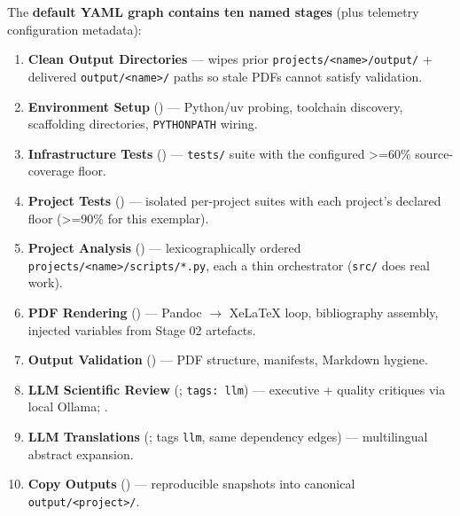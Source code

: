 \documentclass[
  english,
]{article}
\providecommand{\tightlist}{%
  \setlength{\itemsep}{0pt}\setlength{\parskip}{0pt}}
\begin{document}
The \textbf{default YAML graph contains ten named stages} (plus
telemetry configuration metadata):

\begin{enumerate}
\def\labelenumi{\arabic{enumi}.}
\tightlist
\item
  \textbf{Clean Output Directories} --- wipes prior
  \texttt{projects/\textless{}name\textgreater{}/output/} + delivered
  \texttt{output/\textless{}name\textgreater{}/} paths so stale PDFs
  cannot satisfy validation.
\item
  \textbf{Environment Setup} () ---
  Python/uv probing, toolchain discovery, scaffolding directories,
  \texttt{PYTHONPATH} wiring.
\item
  \textbf{Infrastructure Tests}
  () --- \texttt{tests/} suite
  with the configured \texorpdfstring{\textgreater{}=}{>=}60\% source-coverage floor.
\item
  \textbf{Project Tests} ()
  --- isolated per-project suites with each project's declared floor
  (\texorpdfstring{\textgreater{}=}{>=}90\% for this exemplar).
\item
  \textbf{Project Analysis} () ---
  lexicographically ordered
  \texttt{projects/\textless{}name\textgreater{}/scripts/*.py}, each a
  thin orchestrator (\texttt{src/} does real work).
\item
  \textbf{PDF Rendering} () --- Pandoc \texorpdfstring{\ensuremath{\to}}{->}
  XeLaTeX loop, bibliography assembly, injected variables from Stage 02
  artefacts.
\item
  \textbf{Output Validation} () --- PDF
  structure, manifests, Markdown hygiene.
\item
  \textbf{LLM Scientific Review}
  (; \texttt{tags:\ llm})
  --- executive + quality critiques via local Ollama;
  .
\item
  \textbf{LLM Translations}
  (; tags
  \texttt{llm}, same dependency edges) --- multilingual abstract
  expansion.
\item
  \textbf{Copy Outputs} () --- reproducible
  snapshots into canonical
  \texttt{output/\textless{}project\textgreater{}/}.
\end{enumerate}
\end{document}
